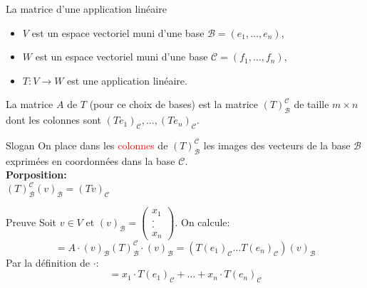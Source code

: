 

\begin{parag}{La matrice d'une application linéaire}
    \begin{itemize}
        \item $V$ est un espace vectoriel muni d'une base $\mathcal{B} = \left(e_1, \dots, e_n \right)$,
        \item $W$ est un espace vectoriel muni d'une base $\mathcal{C} = \left(f_1, \dots, f_n\right)$,
        \item $T : V \to W$ est une application linéaire.
    \end{itemize}


    \begin{definition}
        La matrice $A$ de $T$ (pour ce choix de bases) est la matrice $\left(T\right)_{\mathcal{B}}^{\mathcal{C}}$ de taille $m \times n$ dont les colonnes sont $\left(Te_1\right)_{\mathcal{C}}, \dots, \left(Te_n\right)_{\mathcal{C}}$.
    \end{definition}
    \begin{subparag}{Slogan}
        On place dans les \textcolor{red}{colonnes} de $\left(T\right)_{\mathcal{B}}^{\mathcal{C}}$ les images des vecteurs de la base $\mathcal{B}$ exprimées en coordonnées dans la base $\mathcal{C}$.
        \\
        \textbf{Porposition:} \\
        $\left(T\right)_{\mathcal{B}}^{\mathcal{C}}\left(v\right)_{\mathcal{B}} = \left(Tv\right)_{\mathcal{C}}$
    \end{subparag}
    \begin{subparag}{Preuve}
        Soit $v \in V$ et $\left(v\right)_{\mathcal{B}} = \begin{pmatrix}
            x_1 \\ . \\ . \\ x_n
        \end{pmatrix}$. On calcule:
        \[ = A \cdot \left(v\right)_{\mathcal{B}} \left(T\right)_{\mathcal{B}}^{\mathcal{C}}\cdot\left(v\right)_{\mathcal{B}} = \left(T\left(e_1\right)_{\mathcal{C}} \dots T\left(e_n\right)_{\mathcal{C}}\right)\left(v\right)_{\mathcal{B}}\]
        Par la définition de $\cdot$:
        \[= x_1 \cdot T\left(e_1\right)_{\mathcal{C}} + \dots + x_n \cdot T\left(e_n\right)_{\mathcal{C}}\]


\end{subparag}
\end{parag}
